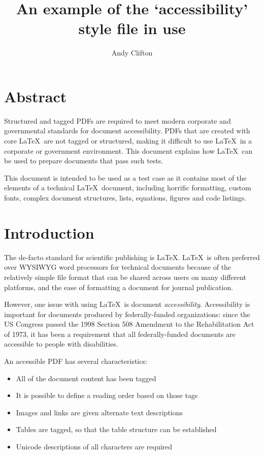 \documentclass[10pt,twocolumn]{article}
\author{Andy Clifton}
\title{An example of the `accessibility' style file in use}
\begin{document}
\maketitle

\section*{Abstract}
Structured and tagged PDFs are required to meet modern corporate and governmental standards for document accessibility. PDFs that are created with core \LaTeX\ are not tagged or structured, making it difficult to use \LaTeX\ in a corporate or government environment. This document explains how \LaTeX\ can be used to prepare documents that pass such tests.

This document is intended to be used as a test case as it contains most of the elements of a technical \LaTeX\ document, including horrific formatting, custom fonts, complex document structures, lists, equations, figures and code listings.

\tableofcontents
\listoffigures
\listoftables

\section{Introduction}
The de-facto standard for scientific publishing is \LaTeX. \LaTeX\ is often preferred over WYSIWYG word processors for technical documents because of the relatively simple file format that can be shared across users on many different platforms, and the ease of formatting a document for journal publication.

However, one issue with using \LaTeX\ is document \emph{accessibility}. Accessibility is important for documents produced by federally-funded organizations: since the US Congress passed the 1998 Section 508 Amendment to the Rehabilitation Act of 1973, it has been a requirement that all federally-funded documents are accessible to people with disabilities.

An accessible PDF has several characteristics:

\begin{itemize}
\item All of the document content has been tagged
\item It is possible to define a reading order based on those tags
\item Images and links are given alternate text descriptions
\item Tables are tagged, so that the table structure can be established
\item Unicode descriptions of all characters are required
\end{itemize}
\end{document}
